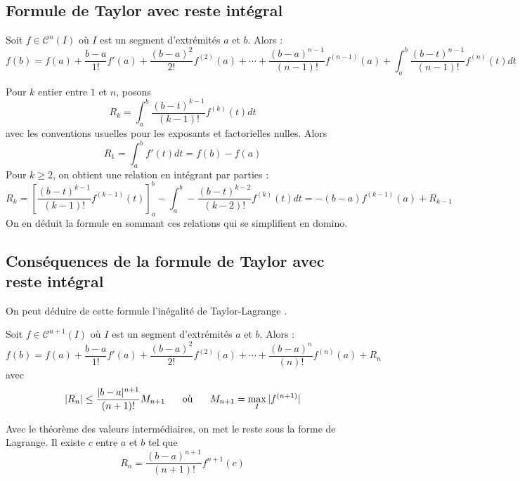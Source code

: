 \subsection{Formule de Taylor avec reste intégral}
\begin{prop}
 Soit $f\in \mathcal C^{n}(I)$ où $I$ est un segment d'extrémités $a$ et $b$. Alors :
\begin{displaymath}
 f(b)= f(a)+\frac{b-a}{1!}f'(a)+\frac{(b-a)^2}{2!}f^{(2)}(a) + \cdots +
\frac{(b-a)^{n-1}}{(n-1)!}f^{(n-1)}(a) +
\int_{a}^{b}\frac{(b-t)^{n-1}}{(n-1)!}f^{(n)}(t)dt
\end{displaymath}
\end{prop}
\begin{demo}
 Pour $k$ entier entre $1$ et $n$, posons
\begin{displaymath}
 R_k = \int_a^b\frac{(b-t)^{k-1}}{(k-1)!}f^{(k)}(t)dt
\end{displaymath}
avec les conventions usuelles pour les exposants et factorielles nulles. Alors
\begin{displaymath}
 R_1 = \int_a^bf'(t)dt = f(b)-f(a)
\end{displaymath}
Pour $k\geq 2$, on obtient une relation en intégrant par parties :
\begin{displaymath}
 R_k = \left[ \frac{(b-t)^{k-1}}{(k-1)!}f^{(k-1)}(t)\right]_a^b - 
\int_a^b-\frac{(b-t)^{k-2}}{(k-2)!}f^{(k)}(t)dt 
= -(b-a)f^{(k-1)}(a) + R_{k-1}
\end{displaymath}
On en déduit la formule en sommant ces relations qui se simplifient en domino.
\end{demo}

\subsection{Conséquences de la formule de Taylor avec reste intégral}
On peut déduire de cette formule l'inégalité de Taylor-Lagrange .
\begin{prop}
 Soit $f\in \mathcal C^{n+1}(I)$ où $I$ est un segment d'extrémités $a$ et $b$. Alors :
\begin{displaymath}
 f(b)= f(a)+\frac{b-a}{1!}f'(a)+\frac{(b-a)^2}{2!}f^{(2)}(a) + \cdots +
\frac{(b-a)^{n}}{(n)!}f^{(n)}(a) + R_n
\end{displaymath}
avec 
\begin{displaymath}
 |R_n|\leq \frac{|b-a|^{n+1}}{(n+1)!}M_{n+1} \hspace{0.5cm}\text{ où } \hspace{0.5cm} M_{n+1} = \max_I |f^{(n+1)}|
\end{displaymath}
\end{prop}
Avec le théorème des valeurs intermédiaires, on met le reste sous la forme de Lagrange. Il existe $c$ entre $a$ et $b$ tel que 
\begin{displaymath}
  R_n = \frac{(b-a)^{n+1}}{(n+1)!}f^{n+1}(c)
\end{displaymath}

